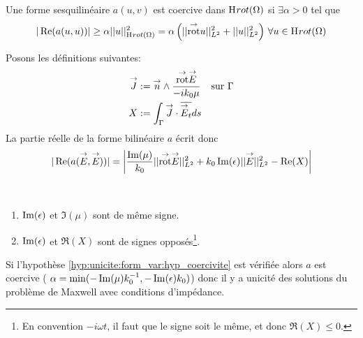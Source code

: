 			\begin{defn}[Coercivité]
				Une forme sesquilinéaire \(a(u,v)\) est coercive dans \(\mathrm{H}_\mathrm{{}}{rot}(\Omega)\) si \(\exists \alpha > 0\) tel que 
				\[
					|\operatorname{Re}(a(u,u))| \ge \alpha ||u||_{\mathrm{H}_\mathrm{{}}{rot}(\Omega)}^2 = \alpha \left( || {{\overset{\rightarrow}{\operatorname{rot}}}} u ||_{L^2}^2 + || u ||_{L^2}^2\right) \, \forall u \in \mathrm{H}_\mathrm{{}}{rot}(\Omega)
				\]
			 \end{defn}


			Posons les définitions suivantes:
			\begin{align*}
				{\overset{\rightarrow}{J}} &:=  {\overset{\rightarrow}{n}} \wedge \dfrac{{{\overset{\rightarrow}{\operatorname{rot}}}} {\overset{\rightarrow}{E}}}{-ik_0\mu} && \text{sur \(\Gamma\)}
				\\X&:= \int_\Gamma {\overset{\rightarrow}{J}} \cdot {\overline{{\overset{\rightarrow}{E}}_t}} ds
			\end{align*}
			La partie réelle de la forme bilinéaire \(a\) écrit donc
			\begin{equation}
				\label{eq:unicite:form_var:decomp_form_bilin_1}
				|\operatorname{Re}(a({\overset{\rightarrow}{E}},{\overset{\rightarrow}{E}}))| = \left|\dfrac{\operatorname{Im}(\mu)}{k_0} || {{\overset{\rightarrow}{\operatorname{rot}}}} {\overset{\rightarrow}{E}} ||_{L^2}^2  + k_0 \operatorname{Im}(\epsilon) || {\overset{\rightarrow}{E}} ||_{L^2}^2
				- \operatorname{Re}(X)\right|
			\end{equation}

			\begin{hyp}\label{hyp:unicite:form_var:hyp_coercivite}
				~{}

				\begin{enumerate}
					\item \(\operatorname{Im}(\epsilon)\) et \(\Im(\mu)\) sont de même signe.
					\item \(\operatorname{Im}(\epsilon)\) et \(\Re(X)\) sont de signes opposés\footnote{En convention \(-i\omega t\), il faut que le signe soit le même, et donc \(\Re(X) \le 0\).}.
				\end{enumerate}
			\end{hyp}

			Si l'hypothèse \ref{hyp:unicite:form_var:hyp_coercivite} est vérifiée alors \(a\) est coercive ( \(\alpha = \min(-\operatorname{Im}(\mu)k_0^{-1},-\operatorname{Im}(\epsilon)k_0)\)) donc il y a unicité des solutions du problème de Maxwell avec conditions d'impédance.

